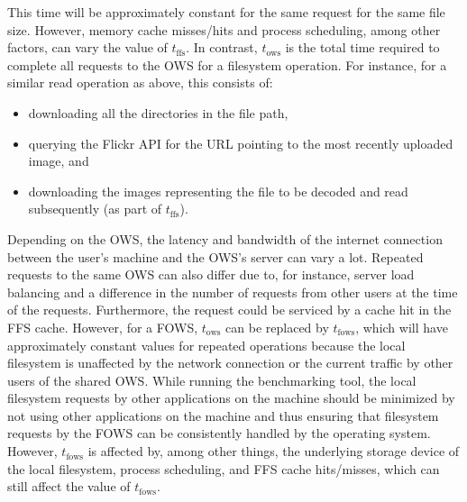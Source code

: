 This time will be approximately constant for the same request for the same file size. However, memory cache misses/hits and process scheduling, among other factors, can vary the value of $t_\text{ffs}$. In contrast, $t_\text{ows}$ is the total time required to complete all requests to the \gls{OWS} for a filesystem operation. For instance, for a similar read operation as above, this consists of:
\begin{itemize}
	\item downloading all the directories in the file path,
	\item querying the Flickr \gls{API} for the URL pointing to the most recently uploaded image, and
	\item downloading the images representing the file to be decoded and read subsequently (as part of $t_\text{ffs}$).
\end{itemize}

Depending on the \gls{OWS}, the latency and bandwidth of the internet connection between the user's machine and the \gls{OWS}'s server can vary a lot. Repeated requests to the same \gls{OWS} can also differ due to, for instance, server load balancing and a difference in the number of requests from other users at the time of the requests. Furthermore, the request could be serviced by a cache hit in the \gls{FFS} cache. However, for a \gls{FOWS}, $t_\text{ows}$ can be replaced by $t_\text{fows}$, which will have approximately constant values for repeated operations because the local filesystem is unaffected by the network connection or the current traffic by other users of the shared \gls{OWS}. While running the benchmarking tool, the local filesystem requests by other applications on the machine should be minimized by not using other applications on the machine and thus ensuring that filesystem requests by the \gls{FOWS} can be consistently handled by the operating system. However, $t_\text{fows}$ is affected by, among other things, the underlying storage device of the local filesystem, process scheduling, and \gls{FFS} cache hits/misses, which can still affect the value of $t_\text{fows}$.

